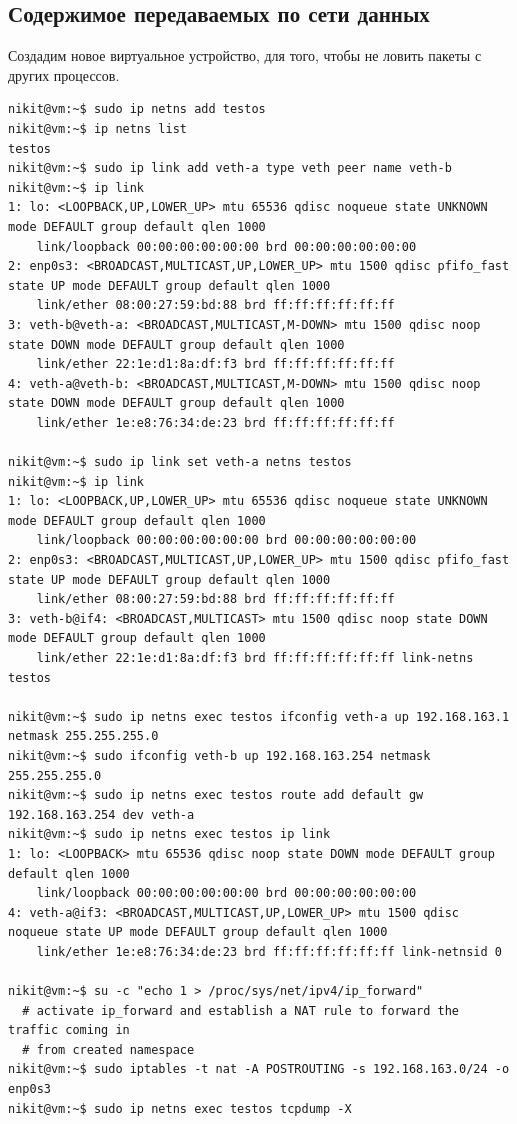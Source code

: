 \documentclass[11pt, a4paper]{article}
\begin{document}
\subsection{Содержимое передаваемых по сети данных}
Создадим новое виртуальное устройство, для того, чтобы не ловить пакеты с других процессов.
\begin{Verbatim}[fontsize=\small,breaklines=true]
nikit@vm:~$ sudo ip netns add testos
nikit@vm:~$ ip netns list
testos
nikit@vm:~$ sudo ip link add veth-a type veth peer name veth-b
nikit@vm:~$ ip link
1: lo: <LOOPBACK,UP,LOWER_UP> mtu 65536 qdisc noqueue state UNKNOWN mode DEFAULT group default qlen 1000
    link/loopback 00:00:00:00:00:00 brd 00:00:00:00:00:00
2: enp0s3: <BROADCAST,MULTICAST,UP,LOWER_UP> mtu 1500 qdisc pfifo_fast state UP mode DEFAULT group default qlen 1000
    link/ether 08:00:27:59:bd:88 brd ff:ff:ff:ff:ff:ff
3: veth-b@veth-a: <BROADCAST,MULTICAST,M-DOWN> mtu 1500 qdisc noop state DOWN mode DEFAULT group default qlen 1000
    link/ether 22:1e:d1:8a:df:f3 brd ff:ff:ff:ff:ff:ff
4: veth-a@veth-b: <BROADCAST,MULTICAST,M-DOWN> mtu 1500 qdisc noop state DOWN mode DEFAULT group default qlen 1000
    link/ether 1e:e8:76:34:de:23 brd ff:ff:ff:ff:ff:ff

nikit@vm:~$ sudo ip link set veth-a netns testos
nikit@vm:~$ ip link
1: lo: <LOOPBACK,UP,LOWER_UP> mtu 65536 qdisc noqueue state UNKNOWN mode DEFAULT group default qlen 1000
    link/loopback 00:00:00:00:00:00 brd 00:00:00:00:00:00
2: enp0s3: <BROADCAST,MULTICAST,UP,LOWER_UP> mtu 1500 qdisc pfifo_fast state UP mode DEFAULT group default qlen 1000
    link/ether 08:00:27:59:bd:88 brd ff:ff:ff:ff:ff:ff
3: veth-b@if4: <BROADCAST,MULTICAST> mtu 1500 qdisc noop state DOWN mode DEFAULT group default qlen 1000
    link/ether 22:1e:d1:8a:df:f3 brd ff:ff:ff:ff:ff:ff link-netns testos

nikit@vm:~$ sudo ip netns exec testos ifconfig veth-a up 192.168.163.1 netmask 255.255.255.0
nikit@vm:~$ sudo ifconfig veth-b up 192.168.163.254 netmask 255.255.255.0
nikit@vm:~$ sudo ip netns exec testos route add default gw 192.168.163.254 dev veth-a
nikit@vm:~$ sudo ip netns exec testos ip link
1: lo: <LOOPBACK> mtu 65536 qdisc noop state DOWN mode DEFAULT group default qlen 1000
    link/loopback 00:00:00:00:00:00 brd 00:00:00:00:00:00
4: veth-a@if3: <BROADCAST,MULTICAST,UP,LOWER_UP> mtu 1500 qdisc noqueue state UP mode DEFAULT group default qlen 1000
    link/ether 1e:e8:76:34:de:23 brd ff:ff:ff:ff:ff:ff link-netnsid 0

nikit@vm:~$ su -c "echo 1 > /proc/sys/net/ipv4/ip_forward"
  # activate ip_forward and establish a NAT rule to forward the traffic coming in
  # from created namespace 
nikit@vm:~$ sudo iptables -t nat -A POSTROUTING -s 192.168.163.0/24 -o enp0s3
nikit@vm:~$ sudo ip netns exec testos tcpdump -X
\end{Verbatim}
\end{document}
